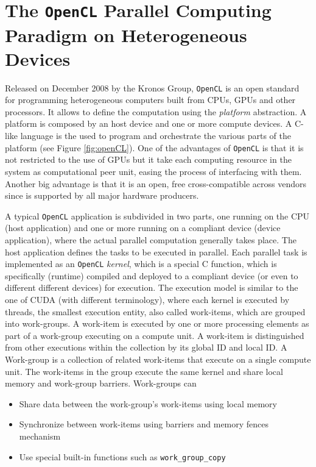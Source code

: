     
    \section{The \texttt{OpenCL} Parallel Computing Paradigm on Heterogeneous Devices}
    Released on December 2008 by the Kronos Group, \texttt{OpenCL} is an open standard for programming heterogeneous computers built from CPUs, GPUs and other processors. It allows to define the computation using the \textit{platform} abstraction. A platform is composed by an host device and one or more compute devices. A C-like language is the used to program and orchestrate the various parts of the platform (see Figure \ref{fig:openCL}).
    One of the advantages of \texttt{OpenCL} is that it is not restricted to the use of
    GPUs but it take each computing resource in the system as computational peer unit, easing the process of interfacing with them. Another big advantage is that it is an open, free cross-compatible across vendors since is supported by all major hardware producers.
    
    A typical \texttt{OpenCL} application is subdivided in two parts, one
    running on the CPU (host application) and one or more running on a
    compliant device (device application), where the actual parallel
    computation generally takes place. The host application defines
    the tasks to be executed in parallel. Each parallel task is
    implemented as an \texttt{OpenCL} \emph{kernel}, which is a special C
    function, which is specifically (runtime) compiled  and deployed to a compliant device (or even to different different devices) for execution. The execution model is similar to the one of CUDA (with different terminology), where each kernel is executed by threads, the smallest execution entity, also called work-items, which are grouped into work-groups. A work-item is executed by one or more processing elements as part of a work-group executing on a compute unit. A work-item is distinguished from other executions within the collection by its global ID and local ID.
    A Work-group is a collection of related work-items that execute on a single compute unit. The work-items in the group execute the same kernel and share local memory and work-group barriers.
    Work-groups can 
    \begin{itemize}
		\item Share data between the work-group's work-items using local memory
		\item Synchronize between work-items using barriers and memory fences mechanism
		\item Use special built-in functions such as \texttt{work\_group\_copy}
    \end{itemize}

